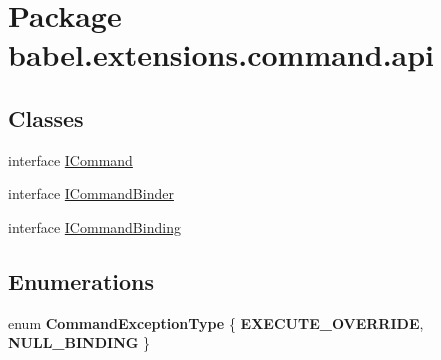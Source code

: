 \hypertarget{namespacebabel_1_1extensions_1_1command_1_1api}{\section{Package babel.\-extensions.\-command.\-api}
\label{namespacebabel_1_1extensions_1_1command_1_1api}
}
\subsection*{Classes}
\begin{DoxyCompactItemize}
\item 
interface \hyperlink{interfacebabel_1_1extensions_1_1command_1_1api_1_1_i_command}{I\-Command}
\item 
interface \hyperlink{interfacebabel_1_1extensions_1_1command_1_1api_1_1_i_command_binder}{I\-Command\-Binder}
\item 
interface \hyperlink{interfacebabel_1_1extensions_1_1command_1_1api_1_1_i_command_binding}{I\-Command\-Binding}
\end{DoxyCompactItemize}
\subsection*{Enumerations}
\begin{DoxyCompactItemize}
\item 
enum {\bfseries Command\-Exception\-Type} \{ {\bfseries E\-X\-E\-C\-U\-T\-E\-\_\-\-O\-V\-E\-R\-R\-I\-D\-E}, 
{\bfseries N\-U\-L\-L\-\_\-\-B\-I\-N\-D\-I\-N\-G}
 \}
\end{DoxyCompactItemize}
